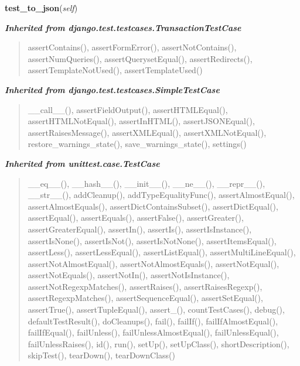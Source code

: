     \label{spatio_main:tests:SerializerTest:test_to_json}

    \vspace{0.5ex}

\hspace{.8\funcindent}\begin{boxedminipage}{\funcwidth}

    \raggedright \textbf{test\_to\_json}(\textit{self})

\setlength{\parskip}{2ex}
\setlength{\parskip}{1ex}
    \end{boxedminipage}


\large{\textbf{\textit{Inherited from django.test.testcases.TransactionTestCase}}}

\begin{quote}
assertContains(), assertFormError(), assertNotContains(), assertNumQueries(), assertQuerysetEqual(), assertRedirects(), assertTemplateNotUsed(), assertTemplateUsed()
\end{quote}

\large{\textbf{\textit{Inherited from django.test.testcases.SimpleTestCase}}}

\begin{quote}
\_\_call\_\_(), assertFieldOutput(), assertHTMLEqual(), assertHTMLNotEqual(), assertInHTML(), assertJSONEqual(), assertRaisesMessage(), assertXMLEqual(), assertXMLNotEqual(), restore\_warnings\_state(), save\_warnings\_state(), settings()
\end{quote}

\large{\textbf{\textit{Inherited from unittest.case.TestCase}}}

\begin{quote}
\_\_eq\_\_(), \_\_hash\_\_(), \_\_init\_\_(), \_\_ne\_\_(), \_\_repr\_\_(), \_\_str\_\_(), addCleanup(), addTypeEqualityFunc(), assertAlmostEqual(), assertAlmostEquals(), assertDictContainsSubset(), assertDictEqual(), assertEqual(), assertEquals(), assertFalse(), assertGreater(), assertGreaterEqual(), assertIn(), assertIs(), assertIsInstance(), assertIsNone(), assertIsNot(), assertIsNotNone(), assertItemsEqual(), assertLess(), assertLessEqual(), assertListEqual(), assertMultiLineEqual(), assertNotAlmostEqual(), assertNotAlmostEquals(), assertNotEqual(), assertNotEquals(), assertNotIn(), assertNotIsInstance(), assertNotRegexpMatches(), assertRaises(), assertRaisesRegexp(), assertRegexpMatches(), assertSequenceEqual(), assertSetEqual(), assertTrue(), assertTupleEqual(), assert\_(), countTestCases(), debug(), defaultTestResult(), doCleanups(), fail(), failIf(), failIfAlmostEqual(), failIfEqual(), failUnless(), failUnlessAlmostEqual(), failUnlessEqual(), failUnlessRaises(), id(), run(), setUp(), setUpClass(), shortDescription(), skipTest(), tearDown(), tearDownClass()
\end{quote}

